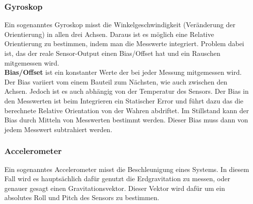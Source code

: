 \subsubsection{Gyroskop}
Ein sogenanntes Gyroskop misst die Winkelgeschwindigkeit (Veränderung der
Orientierung) in allen drei Achsen. Daraus ist es möglich eine Relative
Orientierung zu bestimmen, indem man die Messwerte integriert. Problem dabei ist, das der reale Sensor-Output einen Bias/Offset hat und ein Rauschen mitgemessen wird.\\
\textbf{Bias/Offset} ist ein konstanter Werte der bei jeder Messung mitgemessen wird. Der Bias variiert vom einem Bauteil zum Nächsten, wie auch zwischen den Achsen. Jedoch ist es auch abhängig von der Temperatur des Sensors. Der Bias in den Messwerten ist beim Integrieren ein Statischer Error und führt dazu das die berechnete Relative Orientation von der Wahren abdriftet.
Im Stillstand kann der Bias durch Mitteln von Messwerten bestimmt werden. Dieser Bias muss dann von jedem Messwert subtrahiert werden. 

\subsubsection{Accelerometer}
Ein sogenanntes Accelerometer misst die Beschleunigung eines Systems. In diesem
Fall wird es hauptsächlich dafür genutzt die Erdgravitation zu messen, oder
genauer gesagt einen Gravitationsvektor. Dieser Vektor wird dafür um ein
absolutes Roll und Pitch des Sensors zu bestimmen. 

